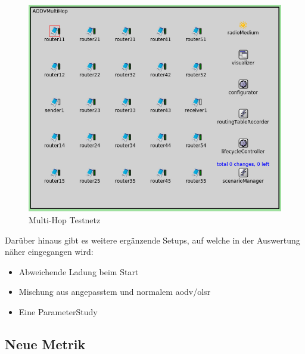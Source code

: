 \begin{figure}
  \centering
  \includegraphics[scale=0.45]{bilder/aodv2.png}
  \caption{Multi-Hop Testnetz}
  \label{image:omnet:aodv2}
\end{figure}

Darüber hinaus gibt es weitere ergänzende Setups, auf welche in der Auswertung näher eingegangen wird: 

\begin{itemize}
\item Abweichende Ladung beim Start
\item Mischung aus angepasstem und normalem \gls{aodv}/\gls{olsr}
\item Eine ParameterStudy
\end{itemize}

\subsection{Neue Metrik}
\label{chapter:versuch:aufbau:metrik}

